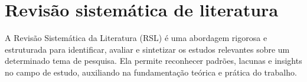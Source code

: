 \chapter[Revisão sistemática de literatura]{Revisão sistemática de literatura}

A Revisão Sistemática da Literatura (RSL) é uma abordagem rigorosa e estruturada para identificar, avaliar e sintetizar os estudos relevantes sobre um determinado tema de pesquisa. Ela permite reconhecer padrões, lacunas e insights no campo de estudo, auxiliando na fundamentação teórica e prática do trabalho.
